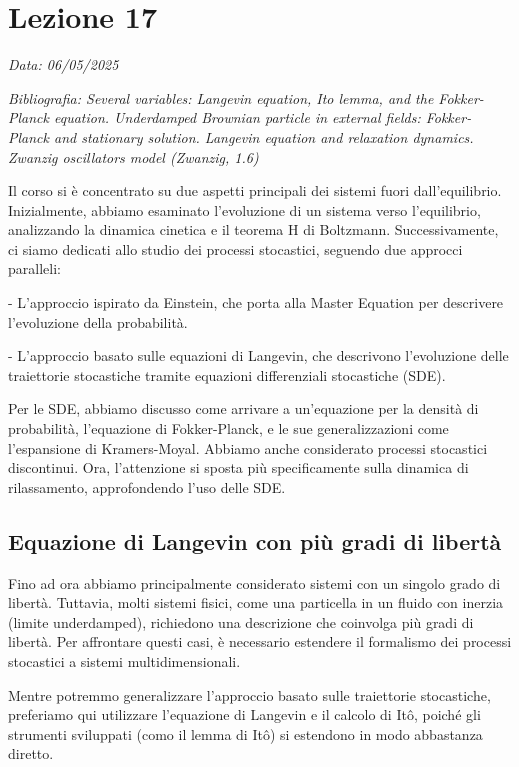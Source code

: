 \chapter{Lezione 17}
\label{chap:lezione_17} %

\begin{flushright}
\textit{Data: 06/05/2025}
\end{flushright}
\textit{Bibliografia: 
Several variables: Langevin equation, Ito lemma, and the Fokker-Planck equation. Underdamped Brownian particle in external fields: Fokker-Planck and stationary solution. Langevin equation and relaxation dynamics. Zwanzig oscillators model (Zwanzig, 1.6)}

\vspace{1cm}

Il corso si è concentrato su due aspetti principali dei sistemi fuori dall'equilibrio. Inizialmente, abbiamo esaminato l'evoluzione di un sistema verso l'equilibrio, analizzando la dinamica cinetica e il teorema H di Boltzmann. Successivamente, ci siamo dedicati allo studio dei processi stocastici, seguendo due approcci paralleli:

- L'approccio ispirato da Einstein, che porta alla Master Equation per descrivere l'evoluzione della probabilità.

- L'approccio basato sulle equazioni di Langevin, che descrivono l'evoluzione delle traiettorie stocastiche tramite equazioni differenziali stocastiche (SDE).

\noindent Per le SDE, abbiamo discusso come arrivare a un'equazione per la densità di probabilità, l'equazione di Fokker-Planck, e le sue generalizzazioni come l'espansione di Kramers-Moyal. Abbiamo anche considerato processi stocastici discontinui. Ora, l'attenzione si sposta più specificamente sulla dinamica di rilassamento, approfondendo l'uso delle SDE.

\section{Equazione di Langevin con più gradi di libertà}
Fino ad ora abbiamo principalmente considerato sistemi con un singolo grado di libertà. Tuttavia, molti sistemi fisici, come una particella in un fluido con inerzia (limite underdamped), richiedono una descrizione che coinvolga più gradi di libertà. Per affrontare questi casi, è necessario estendere il formalismo dei processi stocastici a sistemi multidimensionali.

Mentre potremmo generalizzare l'approccio basato sulle traiettorie stocastiche, preferiamo qui utilizzare l'equazione di Langevin e il calcolo di Itô, poiché gli strumenti sviluppati (como il lemma di Itô) si estendono in modo abbastanza diretto.

